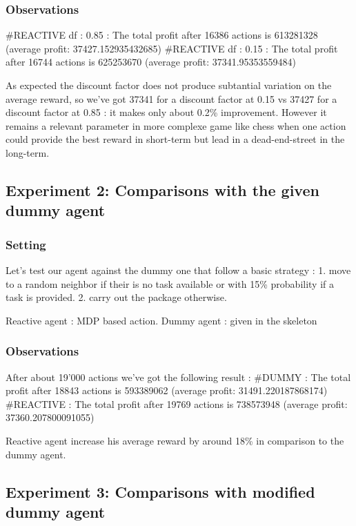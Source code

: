 \documentclass[11pt]{article}
\begin{document}
\subsubsection{Observations}

#REACTIVE df : 0.85 : The total profit after 16386 actions is 613281328 (average profit: 37427.152935432685)
#REACTIVE df : 0.15 : The total profit after 16744 actions is 625253670 (average profit: 37341.95353559484)

As expected the discount factor does not produce subtantial variation on the average reward,
so we've got 37341 for a discount factor at 0.15 vs 37427 for a discount factor at 0.85 : it makes only about 0.2\% improvement.
However it remains a relevant parameter in more complexe game like chess when one action could provide
the best reward in short-term but lead in a dead-end-street in the long-term.

\subsection{Experiment 2: Comparisons with the given dummy agent}

\subsubsection{Setting}

Let's test our agent against the dummy one that follow a basic strategy :
1. move to a random neighbor if their is no task available or with 15\% probability if a task is provided.
2. carry out the package otherwise.

Reactive agent : MDP based action.
Dummy agent : given in the skeleton

\subsubsection{Observations}
After about 19'000 actions we've got the following result :
#DUMMY : The total profit after 18843 actions is 593389062 (average profit: 31491.220187868174)
#REACTIVE : The total profit after 19769 actions is 738573948 (average profit: 37360.207800091055)

Reactive agent increase his average reward by around 18\% in comparison to the dummy agent.

\subsection{Experiment 3: Comparisons with modified dummy agent}
\end{document}
